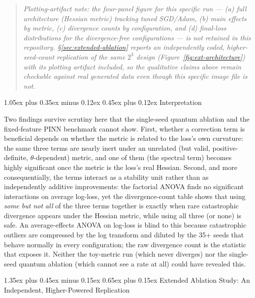 \documentclass[10pt,twocolumn]{article}
\makeatletter
\renewcommand\section{\@startsection{section}{1}{0pt}%
  {1.35ex plus 0.45ex minus 0.15ex}%
  {0.65ex plus 0.15ex}%
  {\large\bfseries}}
\renewcommand\subsection{\@startsection{subsection}{2}{0pt}%
  {1.05ex plus 0.35ex minus 0.12ex}%
  {0.45ex plus 0.12ex}%
  {\normalsize\bfseries}}
\makeatother
\begin{document}
\begin{quote}
\small\textit{Plotting-artifact note: the four-panel figure for this specific
run --- (a) full architecture (Hessian metric) tracking tuned SGD/Adam, (b)
main effects by metric, (c) divergence counts by configuration, and (d)
final-loss distributions for the divergence-free configurations --- is not
retained in this repository. \S\ref{sec:extended-ablation} reports an
independently coded, higher-seed-count replication of the same $2^3$ design
(Figure~\ref{fig:ext-architecture}) with its plotting artifact included, so
the qualitative claims above remain checkable against real generated data
even though this specific image file is not.}
\end{quote}

\subsection{Interpretation}

Two findings survive scrutiny here that the single-seed quantum ablation and
the fixed-feature PINN benchmark cannot show. First, whether a correction term
is beneficial depends on whether the metric is related to the loss's own
curvature: the same three terms are nearly inert under an unrelated
(but valid, positive-definite, $\theta$-dependent) metric, and one of them
(the spectral term) becomes highly significant once the metric is the loss's
real Hessian. Second, and more consequentially, the terms interact as a
stability unit rather than as independently additive improvements: the
factorial ANOVA finds no significant interactions on average log-loss, yet
the divergence-count table shows that using \emph{some but not all} of the
three terms together is exactly when rare catastrophic divergence appears
under the Hessian metric, while using all three (or none) is safe. An
average-effects ANOVA on log-loss is blind to this because catastrophic
outliers are compressed by the log transform and diluted by the 35+ seeds
that behave normally in every configuration; the raw divergence count is the
statistic that exposes it. Neither the toy-metric run (which never
diverges) nor the single-seed quantum ablation (which cannot see a rate at
all) could have revealed this.

\section{Extended Ablation Study: An Independent, Higher-Powered Replication}
\label{sec:extended-ablation}
\end{document}
